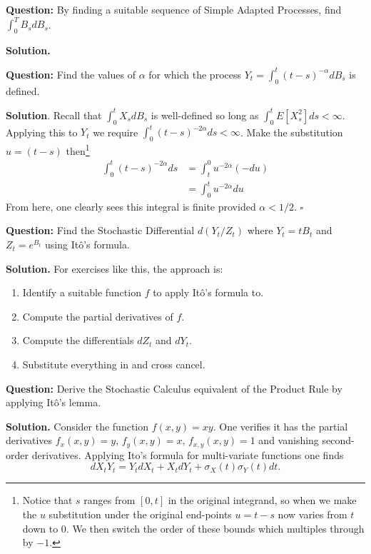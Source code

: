 \documentclass{article}
\begin{document}
\begin{tcolorbox}[colframe=black,colback=gray!5,boxrule=0.5pt]
\textbf{Question:} By finding a suitable sequence of Simple Adapted Processes, find $\int_0^T B_s dB_s$. \cite{Fima}
\end{tcolorbox}
\textbf{Solution.}


\begin{tcolorbox}[colframe=black,colback=gray!5,boxrule=0.5pt]
\textbf{Question:} Find the values of $\alpha$ for which the process $Y_t = \int_0^t(t-s)^{-\alpha}dB_s$ is defined.
\end{tcolorbox}
\textbf{Solution}. Recall that $\int_0^t X_sdB_s$ is well-defined so long as $\int_0^t E[X_s^2]ds<\infty$. Applying this to $Y_t$ we require $\int_0^t(t-s)^{-2\alpha}ds <\infty$. Make the substitution $u = (t-s)$ then\footnote{Notice that $s$ ranges from $[0,t]$ in the original integrand, so when we make the $u$ substitution under the original end-points $u = t-s$ now varies from $t$ down to $0$. We then switch the order of these bounds which multiples through by $-1$.}
\begin{align*}
    \int_0^t(t-s)^{-2\alpha}ds &= \int_t^0 u^{-2\alpha}(-du) \\
    &= \int_0^tu^{-2\alpha}du
\end{align*}
From here, one clearly sees this integral is finite provided $\alpha < 1/2.$ $\square$

\begin{tcolorbox}[colframe=black,colback=gray!5,boxrule=0.5pt]
\textbf{Question:} Find the Stochastic Differential $d(Y_t / Z_t)$ where $Y_t = tB_t$ and $Z_t=e^{B_t}$ using Itô's formula. \cite{Fima}
\end{tcolorbox}
\textbf{Solution.} For exercises like this, the approach is: 
\begin{enumerate}
    \item Identify a suitable function $f$ to apply Itô's formula to. 
    \item Compute the partial derivatives of $f$. 
    \item Compute the differentials $dZ_t$ and $dY_t$. 
    \item Substitute everything in and cross cancel. 
\end{enumerate}


\begin{tcolorbox}[colframe=black,colback=gray!5,boxrule=0.5pt]
\textbf{Question:} Derive the Stochastic Calculus equivalent of the Product Rule by applying Itô's lemma. 
\end{tcolorbox}
\textbf{Solution.} Consider the function $f(x,y) = xy$. One verifies it has the partial derivatives $f_x(x,y)=y$, $f_y(x,y)=x$, $f_{x,y}(x,y)=1$ and vanishing second-order derivatives. Applying Ito's formula for multi-variate functions one finds
$$dX_tY_t = Y_tdX_t + X_tdY_t + \sigma_X(t)\sigma_Y(t)dt.$$
\end{document}
